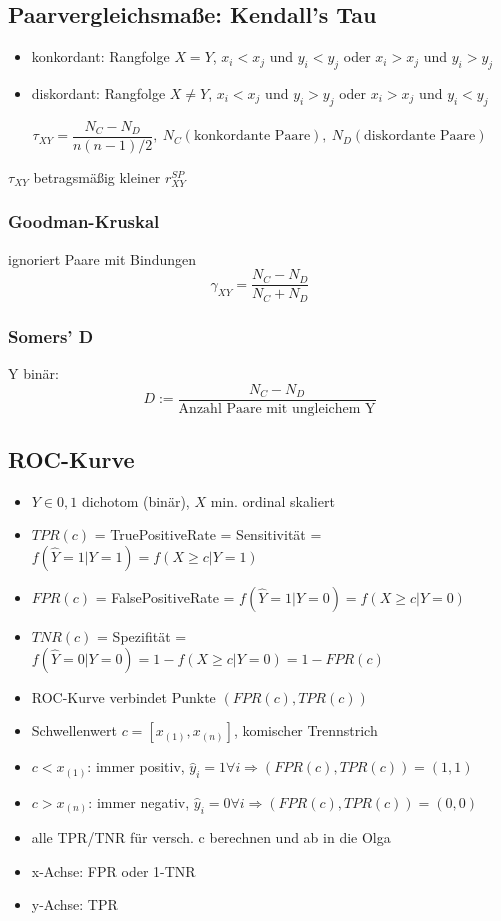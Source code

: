 \documentclass[10pt,a4paper,landscape]{article}
\begin{document}
\begin{multicols}{4}
\subsection{Paarvergleichsmaße: Kendall's Tau}
\begin{itemize}
\item konkordant: Rangfolge $X = Y$, $x_i < x_j$ und $y_i < y_j$ oder $x_i > x_j$ und $y_i > y_j$
\item diskordant: Rangfolge $X \neq Y$, $x_i < x_j$ und $y_i > y_j$ oder $x_i > x_j$ und $y_i < y_j$ 
\end{itemize}

\[
\tau_{XY}= \frac{N_C-N_D}{n(n-1)/2}, ~N_C(\text{konkordante Paare}), ~N_D(\text{diskordante Paare})
\]

$\tau_{XY}$ betragsmäßig kleiner $r_{XY}^{SP}$

\subsubsection{Goodman-Kruskal}
ignoriert Paare mit Bindungen
\[
\gamma_{XY}=\frac{N_C-N_D}{N_C+N_D}
\]

\subsubsection{Somers' D}
Y binär:
\[
D := \frac{N_C-N_D}{\text{Anzahl Paare mit ungleichem Y}}
\]

\subsection{ROC-Kurve}
\begin{itemize}
\item $Y \in {0,1}$ dichotom (binär), $X$ min. ordinal skaliert
\item $TPR(c)$ = TruePositiveRate = Sensitivität = $f(\hat{Y}=1|Y=1)=f(X\geq c|Y=1)$
\item $FPR(c)$ = FalsePositiveRate = $f(\hat{Y}=1|Y=0)=f(X\geq c|Y=0)$
\item $TNR(c)$ = Spezifität = $f(\hat{Y}=0|Y=0)=1-f(X\geq c|Y=0)=1-FPR(c)$
\item ROC-Kurve verbindet Punkte $(FPR(c), TPR(c))$
\item Schwellenwert $c = [x_{(1)}, x_{(n)}]$, komischer Trennstrich
\item $c<x_{(1)}$: immer positiv, $\hat{y}_i=1 \forall i \Rightarrow (FPR(c),TPR(c))=(1,1)$
\item $c>x_{(n)}$: immer negativ, $\hat{y}_i=0 \forall i \Rightarrow (FPR(c),TPR(c))=(0,0)$
\item alle TPR/TNR für versch. c berechnen und ab in die Olga
\item x-Achse: FPR oder 1-TNR
\item y-Achse: TPR
\end{itemize}


\end{multicols}
\end{document}
